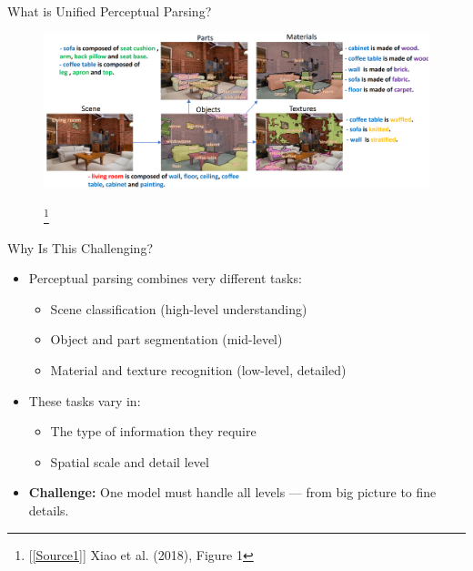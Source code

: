 \documentclass{beamer}
\newcommand\blfootnote[1]{
  \begingroup
  \renewcommand\thefootnote{}\footnote{#1}
  \addtocounter{footnote}{-1}
  \endgroup
}
\begin{document}
\begin{frame}{What is Unified Perceptual Parsing?}
  \begin{figure}
      \centering
        \includegraphics[width=\linewidth]{Images/intro_segmentation.png}
        \blfootnote{[\ref{Source1}] Xiao et al. (2018), Figure 1}
  \end{figure}
\end{frame}


\begin{frame}{Why Is This Challenging?}
  \begin{itemize}
    \item Perceptual parsing combines very different tasks:
    \begin{itemize}
      \item Scene classification (high-level understanding)
      \item Object and part segmentation (mid-level)
      \item Material and texture recognition (low-level, detailed)
    \end{itemize}

    \vspace{0.3cm}

    \item These tasks vary in:
    \begin{itemize}
      \item The type of information they require
      \item Spatial scale and detail level
    \end{itemize}

    \vspace{0.3cm}

    \item \textbf{Challenge:} One model must handle all levels — from big picture to fine details.
  \end{itemize}
\end{frame}
\end{document}
